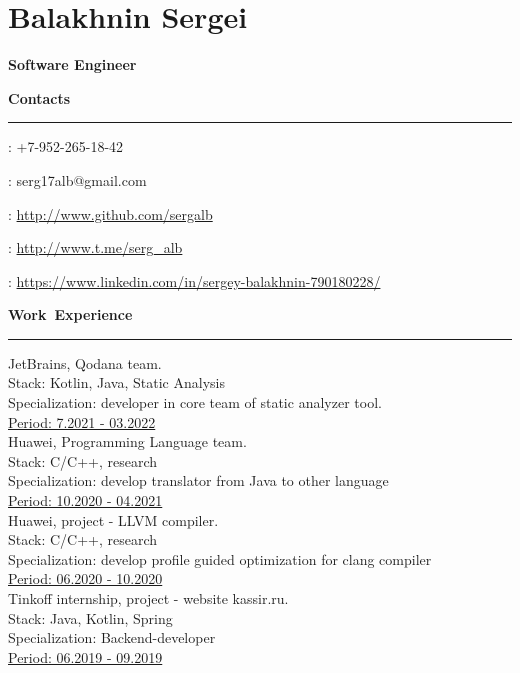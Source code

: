 \documentclass[10pt, a4paper]{report}
\author{Balakhnin Sergei}
\begin{document}
    \section*{Balakhnin Sergei}

    {\large\textbf{Software Engineer}}

    \hbox{\large\textbf{Contacts}}\kern5pt\hrule\kern5pt

    \faPhone: +7-952-265-18-42

    \Letter: serg17alb@gmail.com

    \faGithub: \url{http://www.github.com/sergalb}

    \faSend: \url{http://www.t.me/serg_alb}

    \faLinkedinSquare: \url{https://www.linkedin.com/in/sergey-balakhnin-790180228/}\\




    \par\hbox{\large\textbf{Work Experience}}\kern3pt\hrule\kern10pt

    JetBrains, Qodana team. \\
    Stack: Kotlin, Java, Static Analysis \\
    Specialization: developer in core team of static analyzer tool.\\
    \underline{Period: 7.2021 - 03.2022} \\

    Huawei, Programming Language team. \\
    Stack: C/C++, research \\
    Specialization: develop translator from Java to other language \\
    \underline{Period: 10.2020 - 04.2021} \\

    Huawei, project - LLVM compiler. \\
    Stack: C/C++, research \\
    Specialization: develop profile guided optimization for clang compiler\\
    \underline{Period: 06.2020 - 10.2020} \\

    Tinkoff internship, project - website kassir.ru. \\
    Stack: Java, Kotlin, Spring \\
    Specialization: Backend-developer \\
    \underline{Period: 06.2019 - 09.2019} \\
\end{document}
